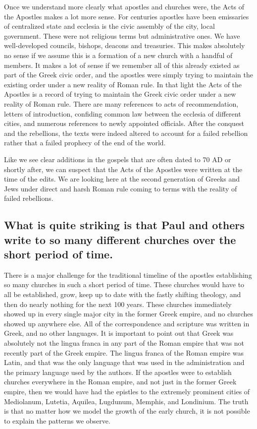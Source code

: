 Once we understand more clearly what apostles and churches were, the Acts of the Apostles makes a lot more sense.
For centuries apostles have been emissaries of centralized state and ecclesia is the civic assembly of the city, local government.
These were not religious terms but administrative ones.
We have well-developed councils, bishops, deacons and treasuries.
This makes absolutely no sense if we assume this is a formation of a new church with a handful of members.
It makes a lot of sense if we remember all of this already existed as part of the Greek civic order, and the apostles were simply trying to maintain the existing order under a new reality of Roman rule.
In that light the Acts of the Apostles is a record of trying to maintain the Greek civic order under a new reality of Roman rule.
There are many references to acts of recommendation, letters of introduction, confiding common law between the ecclesia of different cities, and numerous references to newly appointed officials.
After the conquest and the rebellions, the texts were indeed altered to account for a failed rebellion rather that a failed prophecy of the end of the world.

Like we see clear additions in the gospels that are often dated to 70 AD or shortly after, we can suspect that the Acts of the Apostles were written at the time of the edits.
We are looking here at the second generation of Greeks and Jews under direct and harsh Roman rule coming to terms with the reality of failed rebellions.

\subsection{What is quite striking is that Paul and others write to so many different churches over the short period of time.}\label{subsec:what-is-quite-striking-is-that-paul-and-others-write-to-so-many-different-churches-over-the-short-period-of-time.}

There is a major challenge for the traditional timeline of the apostles establishing so many churches in such a short period of time.
These churches would have to all be established, grow, keep up to date with the fastly shifting theology, and then do nearly nothing for the next 100 years.
These churches immediately showed up in every single major city in the former Greek empire, and no churches showed up anywhere else.
All of the correspondence and scripture was written in Greek, and no other languages.
It is important to point out that Greek was absolutely not the lingua franca in any part of the Roman empire that was not recently part of the Greek empire.
The lingua franca of the Roman empire was Latin, and that was the only language that was used in the administration and the primary language used by the authors.
If the apostles were to establish churches everywhere in the Roman empire, and not just in the former Greek empire, then we would have had the epistles to the extremely prominent cities of Mediolanum, Lutetia, Aquilea, Lugdunum, Memphis, and Londinium.
The truth is that no matter how we model the growth of the early church, it is not possible to explain the patterns we observe.


